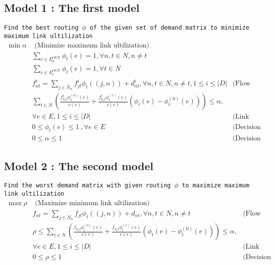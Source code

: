 \documentclass{ctexart}
\begin{document}
\subsection{Model 1 : The first model}
\texttt{Find the best routing $\phi$ of the given set of demand matrix to minimize maximum link ultilization} 
\begin{equation}
	\begin{aligned}
		\min \alpha & \text{  (Minimize maximum link ultilization)}\\
		& \sum_{e\in E_n^{\text{OUT}}}\phi_t(e)=1,\forall n,t \in N, n\not =t \\
		& \sum_{e\in E_t^{\text{OUT}}}\phi_t(e)=1,\forall t \in N \\
		& f_{nt}^i=\sum_{j\in\widetilde{N}_n}f_{jt}^i\phi_t((j,n))+d_{nt}^i, \forall n,t\in N,n\not=t,1\leq i\leq|\textit{D}| & \text{(Flow conservation)}\\
		& \sum_{t\in N}(\frac{f^i_{h_ct}\phi^{(0)}_t(e)}{c(e)}+\frac{f^i_{h_ct}\phi^{(1)}_t(e)}{c(e)}(\phi_t(e)-\phi^{(0)}_t(e)))\leq\alpha,\\
		& \forall e\in E,1\leq i\leq|\textit{D}| & \text{(Link capacity constraint)} \\
		& 0\leq\phi_{t}(e)\leq1\ ,\forall e\in E\ & \text{(Decision variable constraint)}\\
		& 0\leq\alpha\leq1\ & \text{(Decision variable constraint)}
	\end{aligned}
\end{equation}

\subsection{Model 2 : The second model}
\texttt{Find the worst demand matrix with given routing $\phi$  to maximize maximum link ultilization} 
\begin{equation}
	\begin{aligned}
		\max \rho & \text{  (Maximize minimum link ultilization)}\\
		& f_{nt}=\sum_{j\in\widetilde{N}_n}f_{jt}\phi_t((j,n))+d_{nt},\forall n,t\in N,n\not=t & \text{(Flow conservation)}\\
		& \rho\leq\sum_{t\in N}(\frac{f_{h_ct}\phi^{(0)}_t(e)}{c(e)}+\frac{f_{h_ct}\phi^{(1)}_t(e)}{c(e)}(\phi_t(e)-\phi^{(0)}_t(e)))\leq\alpha,\\
		& \forall e\in E,1\leq i\leq|\textit{D}| & \text{(Link capacity constraint)} \\
		& 0\leq\rho\leq1\ & \text{(Decision variable constraint)}
	\end{aligned}
\end{equation}
\end{document}

